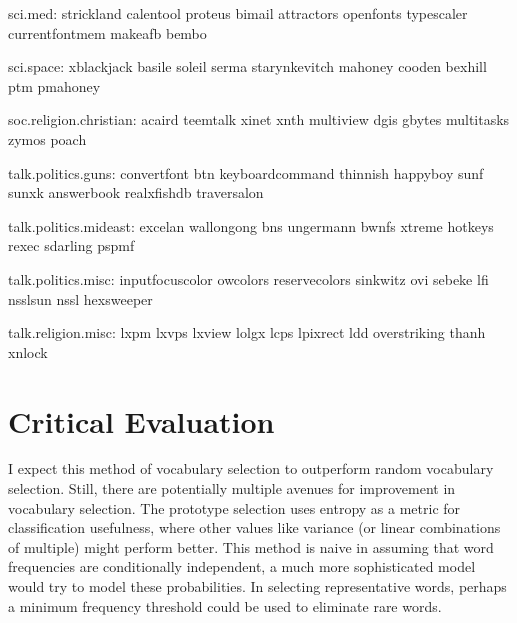 \documentclass[letterpaper,10pt,onecolumn]{IEEEconf}
\begin{document}
sci.med:
strickland
calentool
proteus
bimail
attractors
openfonts
typescaler
currentfontmem
makeafb
bembo
 
sci.space:
xblackjack
basile
soleil
serma
starynkevitch
mahoney
cooden
bexhill
ptm
pmahoney
 
soc.religion.christian:
acaird
teemtalk
xinet
xnth
multiview
dgis
gbytes
multitasks
zymos
poach
 
talk.politics.guns:
convertfont
btn
keyboardcommand
thinnish
happyboy
sunf
sunxk
answerbook
realxfishdb
traversalon
 
talk.politics.mideast:
excelan
wallongong
bns
ungermann
bwnfs
xtreme
hotkeys
rexec
sdarling
pspmf
 
talk.politics.misc:
inputfocuscolor
owcolors
reservecolors
sinkwitz
ovi
sebeke
lfi
nsslsun
nssl
hexsweeper
 
talk.religion.misc:
lxpm
lxvps
lxview
lolgx
lcps
lpixrect
ldd
overstriking
thanh
xnlock



\section{Critical Evaluation}

I expect this method of vocabulary selection to outperform random vocabulary selection. Still, there are potentially multiple avenues for improvement in vocabulary selection. The prototype selection uses entropy as a metric for classification usefulness, where other values  like variance (or linear combinations of multiple) might perform better.
This method is naive in assuming that word frequencies are conditionally independent, a much more sophisticated model would try to model these probabilities. In selecting representative words, perhaps a minimum frequency threshold could be used to eliminate rare words.
\end{document}
